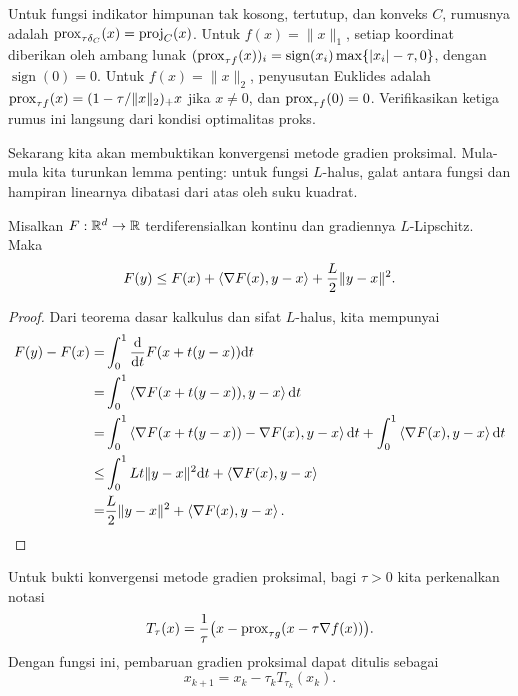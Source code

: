 \begin{example}
    Untuk fungsi indikator himpunan tak kosong, tertutup, dan konveks \(C\), rumusnya adalah \(\mathrm{prox}_{\tau\delta_C}(x)=\mathrm{proj}_C(x)\). Untuk \(f(x)=\|x\|_1\), setiap koordinat diberikan oleh ambang lunak \((\mathrm{prox}_{\tau f}(x))_i=\operatorname{sign}(x_i)\max\{|x_i|-\tau,0\}\), dengan \(\operatorname{sign}(0)=0\). Untuk \(f(x)=\|x\|_2\), penyusutan Euklides adalah \(\mathrm{prox}_{\tau f}(x)=(1-\tau/\|x\|_2)_+x\) jika \(x\neq0\), dan \(\mathrm{prox}_{\tau f}(0)=0\). Verifikasikan ketiga rumus ini langsung dari kondisi optimalitas proks.
\end{example}

Sekarang kita akan membuktikan konvergensi metode gradien proksimal. Mula-mula kita turunkan lemma penting: untuk fungsi \(L\)-halus, galat antara fungsi dan hampiran linearnya dibatasi dari atas oleh suku kuadrat.

\begin{lemma}\label{proximal_gradient:lemma:Lsmoothness}
    Misalkan \(F:\mathbb{R}^d\rightarrow\mathbb{R}\) terdiferensialkan kontinu dan gradiennya \(L\)-Lipschitz. Maka
    \begin{equation}
        F(y)\leq F(x)+\left\langle\nabla F(x) , y-x\right\rangle+\frac{L}{2}\|y-x\|^2.
    \end{equation}
\end{lemma}
\begin{proof}
    Dari teorema dasar kalkulus dan sifat \(L\)-halus, kita mempunyai
    \begin{equation}
        \begin{aligned}
            F(y)-F(x)
            =&\int_0^1\frac{\mathrm{d}}{\mathrm{d} t}F(x+t(y-x))\mathrm{d} t\\
            =&\int_0^1\left\langle\nabla F(x+t(y-x)) , y-x\right\rangle\mathrm{d} t\\
            =&\int_0^1\left\langle\nabla F(x+t(y-x))-\nabla F(x) , y-x\right\rangle\mathrm{d} t
              +\int_0^1\left\langle\nabla F(x) , y-x\right\rangle\mathrm{d} t\\
            \leq&\int_0^1Lt\|y-x\|^2\mathrm{d} t+\left\langle\nabla F(x) , y-x\right\rangle\\
            =&\frac{L}{2}\|y-x\|^2+\left\langle\nabla F(x) , y-x\right\rangle.
        \end{aligned}
    \end{equation}
\end{proof}

Untuk bukti konvergensi metode gradien proksimal, bagi \(\tau>0\) kita perkenalkan notasi
\begin{equation}
    T_\tau(x)=\frac{1}{\tau}\bigl(x-\mathrm{prox}_{\tau g}(x-\tau\nabla f(x))\bigr).
\end{equation}
Dengan fungsi ini, pembaruan gradien proksimal dapat ditulis sebagai
\begin{equation}
    x_{k+1}=x_k-\tau_kT_{\tau_k}(x_k).
\end{equation}

